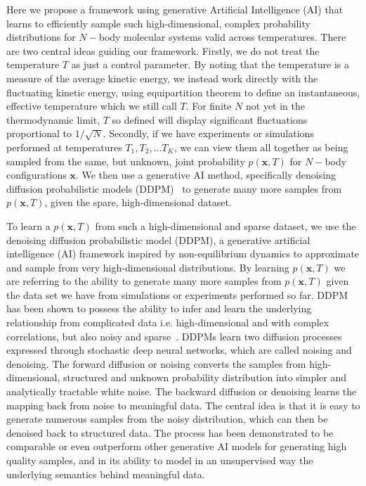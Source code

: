 Here we propose a framework using generative Artificial Intelligence (AI) that learns to efficiently sample such high-dimensional, complex probability distributions for $N-$body molecular systems valid across temperatures. There are two central ideas guiding our framework. Firstly, we do not treat the temperature $T$ as just a control parameter. By noting that the temperature is a measure of the average kinetic energy, we instead work directly with the fluctuating kinetic energy, using equipartition theorem to define an instantaneous, effective temperature which we still call $T$. For finite $N$ not yet in the thermodynamic limit, $T$ so defined will display significant fluctuations proportional to ${1 / \sqrt{N}}$. Secondly, if we have experiments or simulations performed at temperatures $T_1, T_2,...T_K$, we can view them all together as being sampled from the same, but unknown, joint probability $p(\mathbf{x},T)$ for $N-$body configurations $\mathbf{x}$. We then use a generative AI method, specifically denoising diffusion probabilistic models (DDPM)~\cite{Ho2020DDPM,vincent2011connection} to generate many more samples from $p(\mathbf{x},T)$, given the spare, high-dimensional dataset.

To learn a $p(\mathbf{x},T)$ from such a high-dimensional and sparse dataset, we use the denoising diffusion probabilistic model (DDPM),\cite{Ho2020DDPM,vincent2011connection} a generative artificial intelligence (AI) framework inspired by non-equilibrium dynamics to approximate and sample from very high-dimensional distributions. By learning $p(\mathbf{x},T)$ we are referring to the ability to generate many more samples from $p(\mathbf{x},T)$ given the data set we have from simulations or experiments performed so far.  DDPM has been shown to possess the ability to infer and learn the underlying relationship from complicated data i.e. high-dimensional and with complex correlations, but also noisy and sparse~\cite{Ho2020DDPM,vincent2011connection}. DDPMs learn two diffusion processes expressed through stochastic deep neural networks, which are called noising and denoising. The forward diffusion or noising converts the samples from high-dimensional, structured and unknown probability distribution into simpler and analytically tractable white noise. The backward diffusion or denoising learns the mapping back from noise to meaningful data. The central idea is that it is easy to generate numerous samples from the noisy distribution, which can then be denoised back to structured data. The process has been demonstrated to be comparable or even outperform other generative AI models for generating high quality samples, and in its ability to model in an unsupervised way the underlying semantics behind meaningful data.~\cite{Ho2020DDPM, vincent2011connection}

